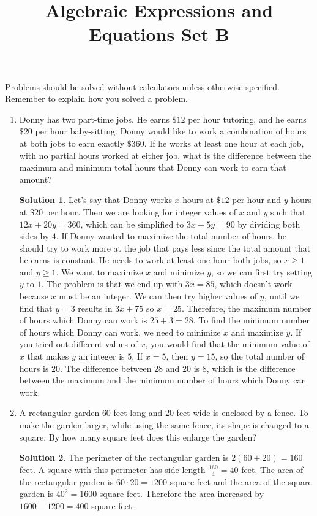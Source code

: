\documentclass{article}
\title{Algebraic Expressions and Equations Set B}
\author{}
\date{}
\theoremstyle{definition}
\newtheorem*{solution}{Solution}
\begin{document}
    \maketitle
    \noindent Problems should be solved without calculators unless otherwise specified. Remember to explain how you solved a problem.
    \begin{enumerate}
        \item Donny has two part-time jobs. He earns $\$12$ per hour tutoring, and he earns $\$20$ per hour baby-sitting. Donny would like to work a combination of hours at both jobs to earn exactly $\$360$. If he works at least one hour at each job, with no partial hours worked at either job, what is the difference between the maximum and minimum total hours that Donny can work to earn that amount?
        \begin{solution}
            Let's say that Donny works $x$ hours at $\$12$ per hour and $y$ hours at $\$20$ per hour. Then we are looking for integer values of $x$ and $y$ such that $12x + 20y = 360$, which can be simplified to $3x + 5y = 90$ by dividing both sides by $4$. If Donny wanted to maximize the total number of hours, he should try to work more at the job that pays less since the total amount that he earns is constant. He needs to work at least one hour both jobs, so $x \geq 1$ and $y \geq 1$. We want to maximize $x$ and minimize $y$, so we can first try setting $y$ to $1$. The problem is that we end up with $3x = 85$, which doesn't work because $x$ must be an integer. We can then try higher values of $y$, until we find that $y = 3$ results in $3x + 75$ so $x = 25$. Therefore, the maximum number of hours which Donny can work is $25 + 3 = 28$. To find the minimum number of hours which Donny can work, we need to minimize $x$ and maximize $y$. If you tried out different values of $x$, you would find that the minimum value of $x$ that makes $y$ an integer is $5$. If $x = 5$, then $y = 15$, so the total number of hours is $20$. The difference between $28$ and $20$ is $8$, which is the difference between the maximum and the minimum number of hours which Donny can work.
        \end{solution}
        \item A rectangular garden $60$ feet long and $20$ feet wide is enclosed by a fence. To make the garden larger, while using the same fence, its shape is changed to a square. By how many square feet does this enlarge the garden?
        \begin{solution}
            The perimeter of the rectangular garden is $2(60 + 20) = 160$ feet. A square with this perimeter has side length $\frac{160}{4} = 40$ feet. The area of the rectangular garden is $60 \cdot 20 = 1200$ square feet and the area of the square garden is $40^2 = 1600$ square feet. Therefore the area increased by $1600 - 1200 = 400$ square feet.

\end{solution}
\end{enumerate}
\end{document}
